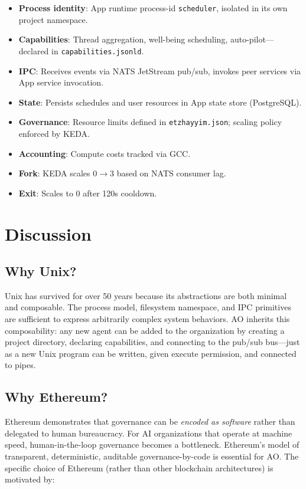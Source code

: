 \documentclass[11pt,a4paper]{article}
\begin{document}
\begin{itemize}[nosep]
  \item \textbf{Process identity}: App runtime process-id \texttt{scheduler}, isolated
    in its own project namespace.
  \item \textbf{Capabilities}: Thread aggregation, well-being scheduling,
    auto-pilot---declared in \texttt{capabilities.jsonld}.
  \item \textbf{IPC}: Receives events via NATS JetStream pub/sub, invokes
    peer services via App service invocation.
  \item \textbf{State}: Persists schedules and user resources in App state
    store (PostgreSQL).
  \item \textbf{Governance}: Resource limits defined in
    \texttt{etzhayyim.json}; scaling policy enforced by KEDA.
  \item \textbf{Accounting}: Compute costs tracked via GCC.
  \item \textbf{Fork}: KEDA scales 0$\rightarrow$3 based on NATS consumer lag.
  \item \textbf{Exit}: Scales to 0 after 120s cooldown.
\end{itemize}

\section{Discussion}

\subsection{Why Unix?}

Unix has survived for over 50 years because its abstractions are both minimal
and composable. The process model, filesystem namespace, and IPC primitives
are sufficient to express arbitrarily complex system behaviors. AO inherits
this composability: any new agent can be added to the organization by
creating a project directory, declaring capabilities, and connecting to the
pub/sub bus---just as a new Unix program can be written, given execute
permission, and connected to pipes.

\subsection{Why Ethereum?}

Ethereum demonstrates that governance can be \emph{encoded as software}
rather than delegated to human bureaucracy. For AI organizations that
operate at machine speed, human-in-the-loop governance becomes a
bottleneck. Ethereum's model of transparent, deterministic, auditable
governance-by-code is essential for AO. The specific choice of Ethereum
(rather than other blockchain architectures) is motivated by:
\end{document}
